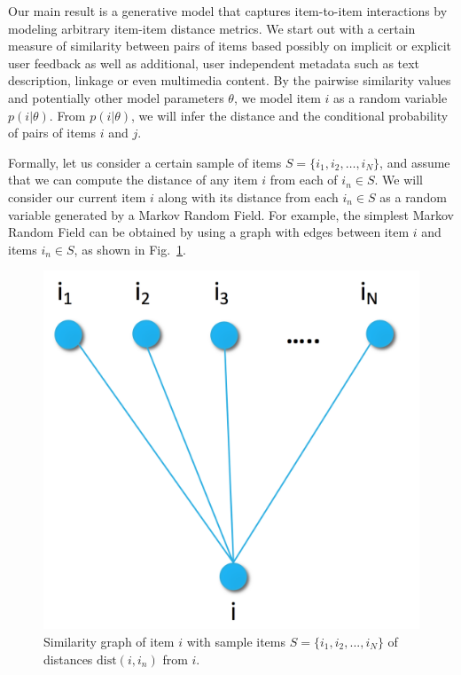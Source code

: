 \documentclass[preprint]{sig-alternate-05-2015}
\begin{document}
Our main result is a generative model that captures item-to-item interactions by modeling arbitrary item-item distance metrics.
We start out with a certain measure of similarity between pairs of items based possibly on implicit or explicit user feedback as well as additional, user independent metadata such as text description, linkage or even multimedia content. 
By the pairwise similarity values and potentially other model parameters $\theta$, we model item $i$ as a random variable $p (i|\theta)$. 
From $p (i|\theta)$, we will infer the distance and the conditional probability of pairs of items $i$ and $j$.

Formally, let us consider a certain sample of items $S=\{i_1,i_2,\ldots,i_N\}$, and assume that we can compute the distance of any item $i$ from each of $i_n \in S$.
We will consider our current item $i$ along with its distance from each $i_n\in S$ as a random variable generated by a Markov Random Field.
For example, the simplest Markov Random Field can be obtained by using a graph with edges between item $i$ and items $i_n\in S$, as shown in  Fig.~\ref{fig:pairwise}. 

\begin{figure}
\centerline{
  \includegraphics[scale=.2]{i2i_pair.png}}

\caption[]{Similarity graph of item $i$ with sample items $S=\{i_1,i_2,...,i_{N}\}$ of distances $\mbox{dist}(i,i_n)$ from $i$.}
\label{fig:pairwise}
\end{figure}
\end{document}

